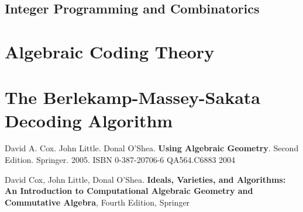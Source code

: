 \documentclass[10pt]{amsart}
\begin{document}
\begin{multicols*}{2}
\subsection{Integer Programming and Combinatorics}



\section{Algebraic Coding Theory}


\section{The Berlekamp-Massey-Sakata Decoding Algorithm}







\end{multicols*}

\begin{thebibliography}{9}

David A. Cox.  John Little. Donal O'Shea. \textbf{Using Algebraic Geometry}.  Second Edition.  Springer.  2005.  ISBN 0-387-20706-6 QA564.C6883 2004

David Cox, John Little, Donal O'Shea. \textbf{Ideals, Varieties, and Algorithms: An Introduction to Computational Algebraic Geometry and Commutative Algebra}, Fourth Edition, Springer


\end{thebibliography}
\end{document}
